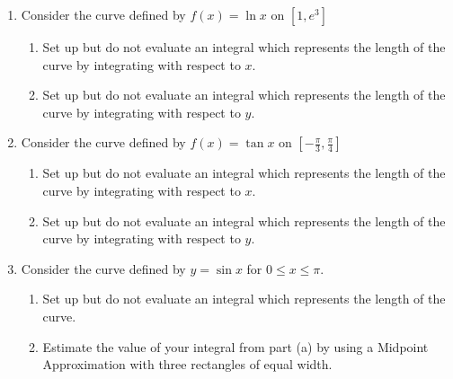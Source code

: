 \documentclass[12pt]{article}
\newif\ifans
\begin{document}
\begin{enumerate}
\item Consider the curve defined by $f(x)=\ln{x}$ on $\left[1,e^3\right]$

\begin{enumerate}

\item Set up but do not evaluate an integral which represents the length of the curve by integrating with respect to $x$.

\ifans{\fbox{$L=\int_1^{e^3} \sqrt{1+\frac{1}{x^2}} \,dx$}} \fi

\item Set up but do not evaluate an integral which represents the length of the curve by integrating with respect to $y$.

\ifans{\fbox{$L=\int_0^3 \sqrt{1+e^{2y}} \,dy$}} \fi

\end{enumerate}

\item Consider the curve defined by $f(x)=\tan{x}$ on $\left[-\frac{\pi}{3},\frac{\pi}{4}\right]$

\begin{enumerate}

\item Set up but do not evaluate an integral which represents the length of the curve by integrating with respect to $x$.

\ifans{\fbox{$L=\int_{-\frac{\pi}{3}}^{\frac{\pi}{4}} \sqrt{1+\sec^4{x}} \,dx$}} \fi

\item Set up but do not evaluate an integral which represents the length of the curve by integrating with respect to $y$.

\ifans{\fbox{$L=\int_{-\sqrt{3}}^{1} \sqrt{1+\frac{1}{(1+y^2)^2}} \,dy$}} \fi

\end{enumerate}

\item Consider the curve defined by $y=\sin{x}$ for $0 \leq x \leq \pi$.

\begin{enumerate}

\item Set up but do not evaluate an integral which represents the length of the curve.

\ifans{\fbox{$\int_0^\pi \sqrt{1+\cos^2{x}} \,dx$}} \fi

\item Estimate the value of your integral from part (a) by using a Midpoint Approximation with three rectangles of equal width.


\end{enumerate}
\end{enumerate}
\end{document}
